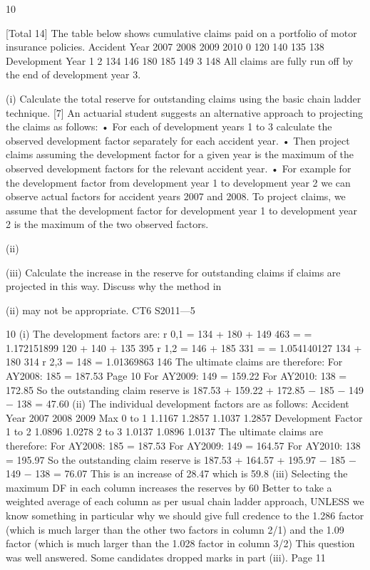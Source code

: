 10

[Total 14]
The table below shows cumulative claims paid on a portfolio of motor insurance
policies.
Accident Year
2007
2008
2009
2010
0
120
140
135
138
Development Year
1
2
134
146
180
185
149
3
148
All claims are fully run off by the end of development year 3.
\item (i)
Calculate the total reserve for outstanding claims using the basic chain ladder
technique.
[7]
An actuarial student suggests an alternative approach to projecting the claims as
follows:
• For each of development years 1 to 3 calculate the observed development factor
separately for each accident year.
• Then project claims assuming the development factor for a given year is the
maximum of the observed development factors for the relevant accident year.
• For example for the development factor from development year 1 to development
year 2 we can observe actual factors for accident years 2007 and 2008. To project
claims, we assume that the development factor for development year 1 to
development year 2 is the maximum of the two observed factors.
\item (ii)
\item (iii)
Calculate the increase in the reserve for outstanding claims if claims are
projected in this way.
Discuss why the method in \item (ii) may not be appropriate.
CT6 S2011—5



10
(i)
The development factors are:
r 0,1 = 134 + 180 + 149
463
=
= 1.172151899
120 + 140 + 135
395
r 1,2 = 146 + 185
331
=
= 1.054140127
134 + 180
314
r 2,3 = 148
= 1.01369863
146
The ultimate claims are therefore:
For AY2008: 185  = 187.53
Page 10%
For AY2009: 149   = 159.22
For AY2010: 138    = 172.85
So the outstanding claim reserve is
187.53 + 159.22 + 172.85 − 185 − 149 − 138 = 47.60
(ii)
The individual development factors are as follows:
Accident Year
2007
2008
2009
Max
0 to 1
1.1167
1.2857
1.1037
1.2857
Development Factor
1 to 2
1.0896
1.0278 2 to 3
1.0137
1.0896 1.0137
The ultimate claims are therefore:
For AY2008: 185  = 187.53
For AY2009: 149   = 164.57
For AY2010: 138    = 195.97
So the outstanding claim reserve is
187.53 + 164.57 + 195.97 − 185 − 149 − 138 = 76.07
This is an increase of 28.47 which is 59.8%
(iii)
Selecting the maximum DF in each column increases the reserves by 60%
Better to take a weighted average of each column as per usual chain ladder
approach, UNLESS we know something in particular why we should give full
credence to the 1.286 factor (which is much larger than the other two factors
in column 2/1) and the 1.09 factor (which is much larger than the 1.028 factor
in column 3/2)
This question was well answered. Some candidates dropped marks in part (iii).
Page 11%
